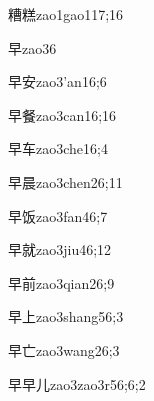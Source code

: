 \begin{verbete}{糟糕}{zao1gao1}{17;16}
\end{verbete}

\begin{verbete}{早}{zao3}{6}
\end{verbete}

\begin{verbete}{早安}{zao3'an1}{6;6}
\end{verbete}

\begin{verbete}{早餐}{zao3can1}{6;16}
\end{verbete}

\begin{verbete}{早车}{zao3che1}{6;4}
\end{verbete}

\begin{verbete}{早晨}{zao3chen2}{6;11}
\end{verbete}

\begin{verbete}{早饭}{zao3fan4}{6;7}
\end{verbete}

\begin{verbete}{早就}{zao3jiu4}{6;12}
\end{verbete}

\begin{verbete}{早前}{zao3qian2}{6;9}
\end{verbete}

\begin{verbete}{早上}{zao3shang5}{6;3}
\end{verbete}

\begin{verbete}{早亡}{zao3wang2}{6;3}
\end{verbete}

\begin{verbete}{早早儿}{zao3zao3r5}{6;6;2}
\end{verbete}

